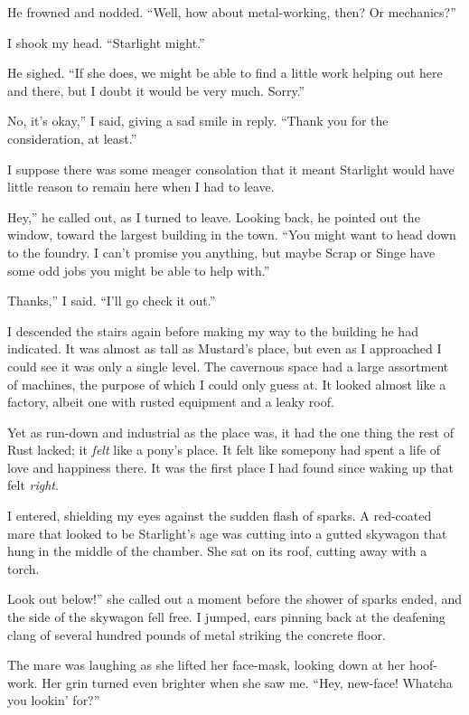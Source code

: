 He frowned and nodded. “Well, how about metal-working, then? Or mechanics?”

I shook my head. “Starlight might.”

He sighed. “If she does, we might be able to find a little work helping out here and there, but I doubt it would be very much. Sorry.”

\leavevmode{}No, it’s okay,” I said, giving a sad smile in reply. “Thank you for the consideration, at least.”

I suppose there was some meager consolation that it meant Starlight would have little reason to remain here when I had to leave.

\leavevmode{}Hey,” he called out, as I turned to leave. Looking back, he pointed out the window, toward the largest building in the town. “You might want to head down to the foundry. I can’t promise you anything, but maybe Scrap or Singe have some odd jobs you might be able to help with.”

\leavevmode{}Thanks,” I said. “I’ll go check it out.”

I descended the stairs again before making my way to the building he had indicated. It was almost as tall as Mustard’s place, but even as I approached I could see it was only a single level. The cavernous space had a large assortment of machines, the purpose of which I could only guess at. It looked almost like a factory, albeit one with rusted equipment and a leaky roof.

Yet as run-down and industrial as the place was, it had the one thing the rest of Rust lacked; it \textit{felt} like a pony’s place. It felt like somepony had spent a life of love and happiness there. It was the first place I had found since waking up that felt \textit{right}.

I entered, shielding my eyes against the sudden flash of sparks. A red-coated mare that looked to be Starlight’s age was cutting into a gutted skywagon that hung in the middle of the chamber. She sat on its roof, cutting away with a torch.

\leavevmode{}Look out below!” she called out a moment before the shower of sparks ended, and the side of the skywagon fell free. I jumped, ears pinning back at the deafening clang of several hundred pounds of metal striking the concrete floor.

The mare was laughing as she lifted her face-mask, looking down at her hoof-work. Her grin turned even brighter when she saw me. “Hey, new-face! Whatcha you lookin’ for?”


